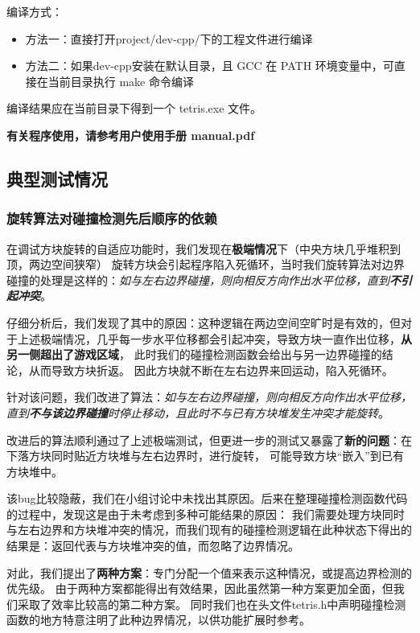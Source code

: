 \documentclass{style/ucasproposal}
\begin{document}
编译方式：
\begin{itemize}
    \item 方法一：直接打开project/dev-cpp/下的工程文件进行编译
    \item 方法二：如果dev-cpp安装在默认目录，且 GCC 在 PATH 环境变量中，可直接在当前目录执行 make 命令编译
\end{itemize}

编译结果应在当前目录下得到一个 tetris.exe 文件。

\textbf{有关程序使用，请参考用户使用手册 manual.pdf}

\subsection{典型测试情况}

\subsubsection{旋转算法对碰撞检测先后顺序的依赖}

在调试方块旋转的自适应功能时，我们发现在\textbf{极端情况}下（中央方块几乎堆积到顶，两边空间狭窄）
旋转方块会引起程序陷入死循环，当时我们旋转算法对边界碰撞的处理是这样的：\textit{如与左右边界碰撞，则向相反方向作出水平位移，直到\textbf{不引起冲突}}。

仔细分析后，我们发现了其中的原因：这种逻辑在两边空间空旷时是有效的，但对于上述极端情况，几乎每一步水平位移都会引起冲突，导致方块一直作出位移，\textbf{从另一侧超出了游戏区域}，
此时我们的碰撞检测函数会给出与另一边界碰撞的结论，从而导致方块折返。
因此方块就不断在左右边界来回运动，陷入死循环。

针对该问题，我们改进了算法：\textit{如与左右边界碰撞，则向相反方向作出水平位移，直到\textbf{不与该边界碰撞}时停止移动，且此时不与已有方块堆发生冲突才能旋转}。

改进后的算法顺利通过了上述极端测试，但更进一步的测试又暴露了\textbf{新的问题}：在下落方块同时贴近方块堆与左右边界时，进行旋转，
可能导致方块“嵌入”到已有方块堆中。

该bug比较隐蔽，我们在小组讨论中未找出其原因。后来在整理碰撞检测函数代码的过程中，发现这是由于未考虑到多种可能结果的原因：
我们需要处理方块同时与左右边界和方块堆冲突的情况，而我们现有的碰撞检测逻辑在此种状态下得出的结果是：返回代表与方块堆冲突的值，而忽略了边界情况。

对此，我们提出了\textbf{两种方案}：专门分配一个值来表示这种情况，或提高边界检测的优先级。
由于两种方案都能得出有效结果，因此虽然第一种方案更加全面，但我们采取了效率比较高的第二种方案。
同时我们也在头文件tetris.h中声明碰撞检测函数的地方特意注明了此种边界情况，以供功能扩展时参考。
\end{document}
